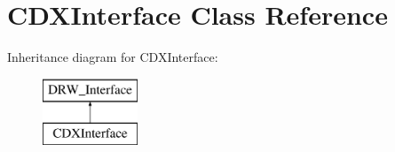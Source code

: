 \hypertarget{class_c_d_x_interface}{}\section{C\+D\+X\+Interface Class Reference}
\label{class_c_d_x_interface}
Inheritance diagram for C\+D\+X\+Interface\+:\begin{figure}[H]
\begin{center}
\leavevmode
\includegraphics[height=2.000000cm]{class_c_d_x_interface}
\end{center}
\end{figure}
